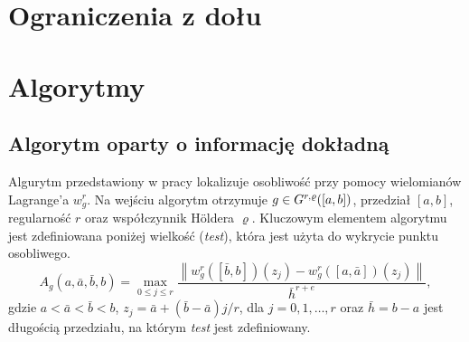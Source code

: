 \documentclass[oik, pdftex, robocza, man]{mgrwms}
\begin{document}
\mgrclosechapter




\chapter{Ograniczenia z dołu}


\mgrclosechapter



\chapter{Algorytmy}

\section{Algorytm oparty o informację dokładną}

Algurytm przedstawiony w pracy \cite{CoDF} lokalizuje osobliwość przy pomocy wielomianów Lagrange'a $w_{g}^{r}$. Na wejściu algorytm otrzymuje $g \in G^{r,\varrho}([a,b])$, przedział $[a,b]$, regularność $r$ oraz współczynnik Höldera $\varrho$. Kluczowym elementem algorytmu jest zdefiniowana poniżej wielkość (\textit{test}), która jest użyta do wykrycie punktu osobliwego.
\begin{equation}
    \label{eqn:test}
    A_{g}(a, \bar{a}, \bar{b}, b)=\max _{0 \leq j \leq r} \frac{\left\|w_{g}^{r}([\bar{b}, b])\left(z_{j}\right)-w_{g}^{r}([a, \bar{a}])\left(z_{j}\right)\right\|}{\bar{h}^{r+e}},
\end{equation}
gdzie $a<\bar{a}<\bar{b}<b$, $z_{j} = \bar{a} + (\bar{b} - \bar{a})j/r$, dla $j=0,1,\dots,r$ oraz $\bar{h} = b - a$ jest długością przedziału, na którym \textit{test} jest zdefiniowany.
\end{document}

